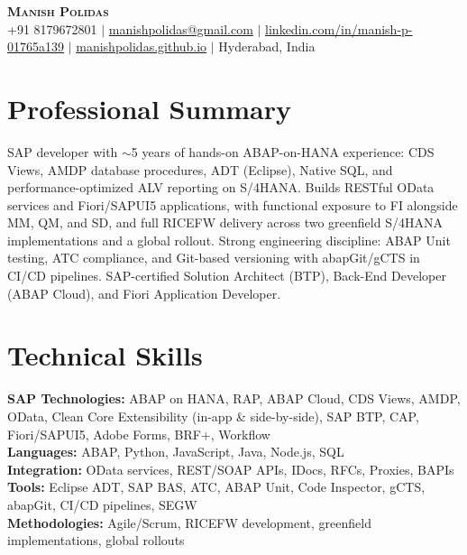 \documentclass[letterpaper,11pt]{article}
\begin{document}
\begin{center}
    \textbf{\Huge \scshape Manish Polidas} \\ \vspace{1pt}
    \small +91 8179672801 $|$ \href{mailto:manishpolidas@gmail.com}{manishpolidas@gmail.com} $|$
    \href{https://www.linkedin.com/in/manish-p-01765a139/}{linkedin.com/in/manish-p-01765a139} $|$
    \href{https://manishpolidas.github.io}{manishpolidas.github.io} $|$ Hyderabad, India
\end{center}

\section{Professional Summary}
SAP developer with $\sim$5 years of hands-on ABAP-on-HANA experience: CDS Views, AMDP database procedures, ADT (Eclipse), Native SQL, and performance-optimized ALV reporting on S/4HANA. Builds RESTful OData services and Fiori/SAPUI5 applications, with functional exposure to FI alongside MM, QM, and SD, and full RICEFW delivery across two greenfield S/4HANA implementations and a global rollout. Strong engineering discipline: ABAP Unit testing, ATC compliance, and Git-based versioning with abapGit/gCTS in CI/CD pipelines. SAP-certified Solution Architect (BTP), Back-End Developer (ABAP Cloud), and Fiori Application Developer.

\section{Technical Skills}
 \begin{itemize}[leftmargin=0.15in, label={}]
    \small{\item{
     \textbf{SAP Technologies:} ABAP on HANA, RAP, ABAP Cloud, CDS Views, AMDP, OData, Clean Core Extensibility (in-app \& side-by-side), SAP BTP, CAP, Fiori/SAPUI5, Adobe Forms, BRF+, Workflow \\
     \textbf{Languages:} ABAP, Python, JavaScript, Java, Node.js, SQL \\
     \textbf{Integration:} OData services, REST/SOAP APIs, IDocs, RFCs, Proxies, BAPIs \\
     \textbf{Tools:} Eclipse ADT, SAP BAS, ATC, ABAP Unit, Code Inspector, gCTS, abapGit, CI/CD pipelines, SEGW \\
     \textbf{Methodologies:} Agile/Scrum, RICEFW development, greenfield implementations, global rollouts \\
    }}
 \end{itemize}
\end{document}
